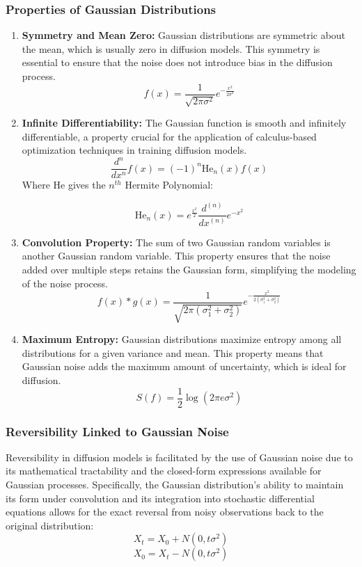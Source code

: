 \documentclass[12pt]{article}
\begin{document}
\subsubsection*{Properties of Gaussian Distributions}
\begin{enumerate}
    \item \textbf{Symmetry and Mean Zero:}
    Gaussian distributions are symmetric about the mean, which is usually zero in diffusion models. This symmetry is essential to ensure that the noise does not introduce bias in the diffusion process.
    \[
    f(x) = \frac{1}{\sqrt{2\pi\sigma^2}} e^{-\frac{x^2}{2\sigma^2}}
    \]
    
    \item \textbf{Infinite Differentiability:}
    The Gaussian function is smooth and infinitely differentiable, a property crucial for the application of calculus-based optimization techniques in training diffusion models.
    \[
    \frac{d^n}{dx^n}f(x) = (-1)^n\text{He}_n(x)f(x)
    \]
Where He gives the \(n^{th}\) Hermite Polynomial:

\[\text{He}_n(x)=e^{\frac{x^2}{2}}\frac{d^{(n)}}{dx^(n)}e^{-x^2}\]

    \item \textbf{Convolution Property:}
    The sum of two Gaussian random variables is another Gaussian random variable. This property ensures that the noise added over multiple steps retains the Gaussian form, simplifying the modeling of the noise process.
    \[
    f(x) * g(x) = \frac{1}{\sqrt{2\pi (\sigma_1^2 + \sigma_2^2)}} e^{-\frac{x^2}{2 (\sigma_1^2 + \sigma_2^2)}}
    \]
    
    \item \textbf{Maximum Entropy:}
    Gaussian distributions maximize entropy among all distributions for a given variance and mean. This property means that Gaussian noise adds the maximum amount of uncertainty, which is ideal for diffusion.
    \[
    S(f) = \frac{1}{2} \log(2\pi e \sigma^2)
    \]
\end{enumerate}

\subsubsection*{Reversibility Linked to Gaussian Noise}
Reversibility in diffusion models is facilitated by the use of Gaussian noise due to its mathematical tractability and the closed-form expressions available for Gaussian processes. Specifically, the Gaussian distribution's ability to maintain its form under convolution and its integration into stochastic differential equations allows for the exact reversal from noisy observations back to the original distribution:
\[
X_t = X_0 + N(0, t\sigma^2)
\]
\[
X_0 = X_t - N(0, t\sigma^2)
\]
\end{document}
